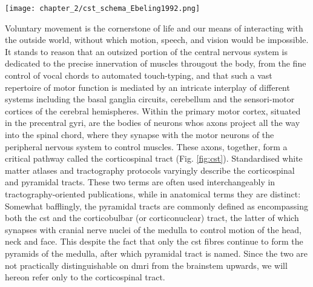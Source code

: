 \begin{SCfigure}[][htb!]
  \texttt{[image: chapter\_2/cst\_schema\_Ebeling1992.png]}
  \caption{ Schematic of corticospinal tract, from \textcite{Ebeling1992}}
  \label{fig:cst}
\end{SCfigure}

Voluntary movement is the cornerstone of life and our means of interacting with the outside world, without which motion, speech, and vision would be impossible.
It stands to reason that an outsized portion of the central nervous system is dedicated to the precise innervation of muscles througout the body, from the fine control of vocal chords to automated touch-typing, and that such a vast repertoire of motor function is mediated by an intricate interplay of different systems including the basal ganglia circuits, cerebellum and the sensori-motor cortices of the cerebral hemispheres.\autocite{Kandel2021}
Within the primary motor cortex, situated in the precentral gyri, are the bodies of neurons whos axons project all the way into the spinal chord, where they synapse with the motor neurons of the peripheral nervous system to control muscles.
These axons, together, form a critical pathway called the corticospinal tract (Fig. \ref{fig:cst}).
Standardised white matter atlases and tractography protocols varyingly describe the corticospinal and pyramidal tracts.
These two terms are often used interchangeably in tractography-oriented publications, while in anatomical terms they are distinct:
Somewhat bafflingly, the pyramidal tracts are commonly defined as encompassing both the \gls{cst} and the corticobulbar (or corticonuclear) tract, the latter of which synapses with cranial nerve nuclei of the medulla to control motion of the head, neck and face.\autocite{Chenot2019}
This despite the fact that only the \gls{cst} fibres continue to form the pyramids of the medulla, after which pyramidal tract is named.
Since the two are not practically distinguishable on \gls{dmri} from the brainstem upwards, we will hereon refer only to the corticospinal tract.%
%
